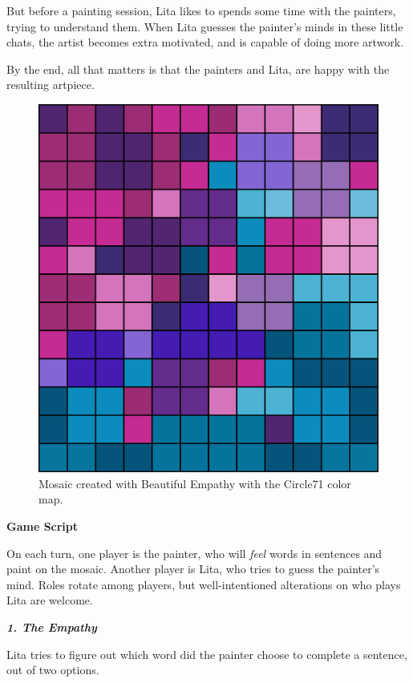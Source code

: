 \documentclass[twocolumn]{article}
\newcommand{\lvl}[1]{\vspace{0.5cm}\Large{\textbf{#1}}\vspace{0.2cm}}
\begin{document}
But before a painting session, Lita likes to spends some time with the painters, trying to understand them. When Lita guesses the painter's minds in these little chats, the artist becomes extra motivated, and is capable of doing more artwork. 

By the end, all that matters is that the painters and Lita, are happy with the resulting artpiece.

\newpage

\begin{figure}[t!]
\centering
\includegraphics[scale=0.18]{sario210222.png}
\caption{Mosaic created with Beautiful Empathy with the Circle71 color map.}
\label{fig:mosaic_2}
\end{figure}


\lvl{Game Script}

On each turn, one player is the painter, who will \textit{feel} words in sentences and paint on the mosaic. Another player is Lita, who tries to guess the painter's mind. Roles rotate among players, but well-intentioned alterations on who plays Lita are welcome. 

\lvl{\textit{1. The Empathy}}

Lita tries to figure out which word did the painter choose to complete a sentence, out of two options.
\end{document}
